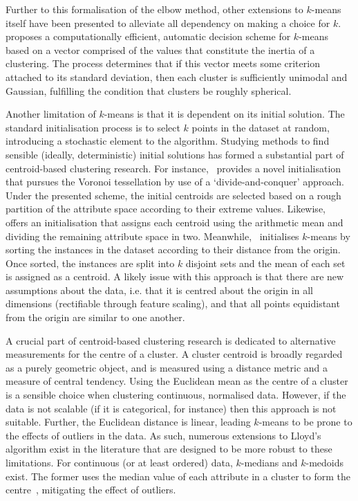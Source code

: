 Further to this formalisation of the elbow method, other extensions to
\(k\)-means itself have been presented to alleviate all dependency on making a
choice for \(k\).~\cite{Olukanmi2019} proposes a computationally efficient,
automatic decision scheme for \(k\)-means based on a vector comprised of the
values that constitute the inertia of a clustering. The process determines that
if this vector meets some criterion attached to its standard deviation, then
each cluster is sufficiently unimodal and Gaussian, fulfilling the condition
that clusters be roughly spherical.

Another limitation of \(k\)-means is that it is dependent on its initial
solution. The standard initialisation process is to select \(k\) points in the
dataset at random, introducing a stochastic element to the algorithm. Studying
methods to find sensible (ideally, deterministic) initial solutions has formed a
substantial part of centroid-based clustering research. For
instance,~\cite{Manoharan2016} provides a novel initialisation that pursues the
Voronoi tessellation by use of a `divide-and-conquer' approach. Under the
presented scheme, the initial centroids are selected based on a rough partition
of the attribute space according to their extreme values.
Likewise,~\cite{Singh2013} offers an initialisation that assigns each centroid
using the arithmetic mean and dividing the remaining attribute space in two.
Meanwhile,~\cite{Katara2015} initialises \(k\)-means by sorting the instances in
the dataset according to their distance from the origin. Once sorted, the
instances are split into \(k\) disjoint sets and the mean of each set is
assigned as a centroid. A likely issue with this approach is that there are new
assumptions about the data, i.e. that it is centred about the origin in all
dimensions (rectifiable through feature scaling), and that all points
equidistant from the origin are similar to one another.

A crucial part of centroid-based clustering research is dedicated to alternative
measurements for the centre of a cluster. A cluster centroid is broadly regarded
as a purely geometric object, and is measured using a distance metric and a
measure of central tendency. Using the Euclidean mean as the centre of a cluster
is a sensible choice when clustering continuous, normalised data. However, if
the data is not scalable (if it is categorical, for instance) then this approach
is not suitable. Further, the Euclidean distance is linear, leading \(k\)-means
to be prone to the effects of outliers in the data. As such, numerous
extensions to Lloyd's algorithm exist in the literature that are designed to be
more robust to these limitations. For continuous (or at least ordered) data,
\(k\)-medians and \(k\)-medoids exist. The former uses the median value of each
attribute in a cluster to form the centre~\cite{Arya2001,Bradley1997},
mitigating the effect of outliers.

